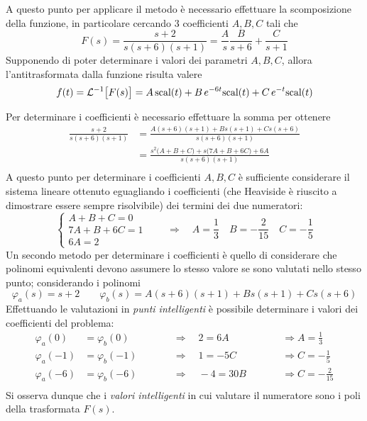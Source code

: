 			A questo punto per applicare il metodo è necessario effettuare la scomposizione della funzione, in particolare cercando 3 coefficienti $A, B , C$ tali che
			\[ F(s) = \frac{s+2}{s(s+6)(s+1)} = \frac A s \frac  B {s+6} +\frac C {s + 1}   \]
			Supponendo di poter determinare i valori dei parametri $A,B,C$, allora l'antitrasformata dalla funzione risulta valere
			\[ f(t) = \mathcal L^{-1} \big[F(s)\big] = A \, \textrm{scal} (t) + B\, e^{-6t}\textrm{scal}(t) + C \, e^{-t} \textrm{scal}(t) \]
		
			Per determinare i coefficienti è necessario effettuare la somma per ottenere
			\begin{align*}
				\frac{s+2}{s(s+6)(s+1)} & = \frac{ A(s+6)(s+1) + B s(s+1) + Cs(s+6) }{s(s+6)(s+1)} \\
				 & = \frac{s^2\big(A+B+C\big)  + s\big(7A + B + 6C\big) + 6A }{s(s+6)(s+1)} \\
			\end{align*}
			A questo punto per determinare i coefficienti $A,B,C$ è sufficiente considerare il sistema lineare ottenuto eguagliando i coefficienti (che Heaviside è riuscito a dimostrare essere sempre risolvibile) dei termini dei due numeratori:
			\[ \begin{cases}
				A+B+C = 0 \\ 7A+B+6C = 1 \\ 6A = 2
			\end{cases} \qquad \Rightarrow \quad A = \frac 1 3  \quad B = - \frac{2}{15} \quad C = - \frac{1}{5} \]
			Un secondo metodo per determinare i coefficienti è quello di considerare che polinomi equivalenti devono assumere lo stesso valore se sono valutati nello stesso punto; considerando i polinomi
			\[ \varphi_a(s)=s+2 \qquad \varphi_b(s) = A(s+6)(s+1) + B s(s+1) + Cs(s+6)  \]
			Effettuando le valutazioni in \textit{punti intelligenti} è possibile determinare i valori dei coefficienti del problema:
			\begin{align*}
				\varphi_a(0) & =\varphi_b(0) \qquad &&\Rightarrow \quad 2 = 6A \qquad &&\Rightarrow A = \frac 1 3 \\
				\varphi_a(-1) & =\varphi_b(-1) \qquad &&\Rightarrow \quad 1 = -5C \qquad &&\Rightarrow C = -\frac 1 5 \\
				\varphi_a(-6) & =\varphi_b(-6) \qquad &&\Rightarrow \quad -4 = 30B \qquad &&\Rightarrow C = -\frac 2 {15} \\
			\end{align*}
			Si osserva dunque che i \textit{valori intelligenti} in cui valutare il numeratore sono i poli della trasformata $F(s)$.
			
